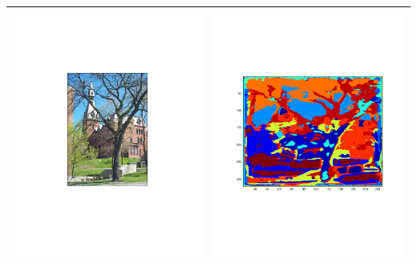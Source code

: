 \documentclass[12pt]{article}
\begin{document}
\begin{longtable}{| c | c |}
  \includegraphics[trim=40mm 40mm 40mm 40mm,clip=true,width=0.45\linewidth]{images/campus_1.pdf} & \includegraphics[trim=25mm 25mm 25mm 25mm,clip=true,width=0.45\linewidth]{images/campus_2.pdf} \\
  \hline

\end{longtable}
\end{document}
